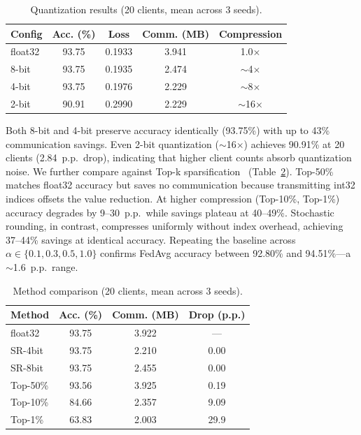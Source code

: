 \begin{table}[t]
\centering
\footnotesize
\caption{Quantization results (20 clients, mean across 3 seeds).}
\label{tab:quantization}
\begin{tabular}{lcccc}
\toprule
Config & Acc. (\%) & Loss & Comm. (MB) & Compression \\
\midrule
float32 & 93.75 & 0.1933 & 3.941 & 1.0$\times$ \\
8-bit   & 93.75 & 0.1935 & 2.474 & $\sim$4$\times$ \\
4-bit   & 93.75 & 0.1976 & 2.229 & $\sim$8$\times$ \\
2-bit   & 90.91 & 0.2990 & 2.229 & $\sim$16$\times$ \\
\bottomrule
\end{tabular}
\end{table}

Both 8-bit and 4-bit preserve accuracy identically (93.75\%) with up to 43\%
communication savings. Even 2-bit quantization ($\sim$16$\times$) achieves
90.91\% at 20 clients (2.84~p.p.\ drop), indicating that higher client counts
absorb quantization noise. We further compare against Top-k
sparsification~\cite{aji2017topk} (Table~\ref{tab:comparison}). Top-50\%
matches float32 accuracy but saves no communication because transmitting
int32 indices offsets the value reduction. At higher compression (Top-10\%,
Top-1\%) accuracy degrades by 9--30~p.p.\ while savings plateau at 40--49\%.
Stochastic rounding, in contrast, compresses uniformly without index overhead,
achieving 37--44\% savings at identical accuracy. Repeating the baseline
across $\alpha \in \{0.1, 0.3, 0.5, 1.0\}$ confirms FedAvg accuracy between
92.80\% and 94.51\%---a $\sim$1.6~p.p.\ range.

\begin{table}[t]
\centering
\footnotesize
\caption{Method comparison (20 clients, mean across 3 seeds).}
\label{tab:comparison}
\begin{tabular}{lccc}
\toprule
Method & Acc. (\%) & Comm. (MB) & Drop (p.p.) \\
\midrule
float32  & 93.75 & 3.922 & ---  \\
SR-4bit  & 93.75 & 2.210 & 0.00 \\
SR-8bit  & 93.75 & 2.455 & 0.00 \\
Top-50\% & 93.56 & 3.925 & 0.19 \\
Top-10\% & 84.66 & 2.357 & 9.09 \\
Top-1\%  & 63.83 & 2.003 & 29.9 \\
\bottomrule
\end{tabular}
\end{table}
